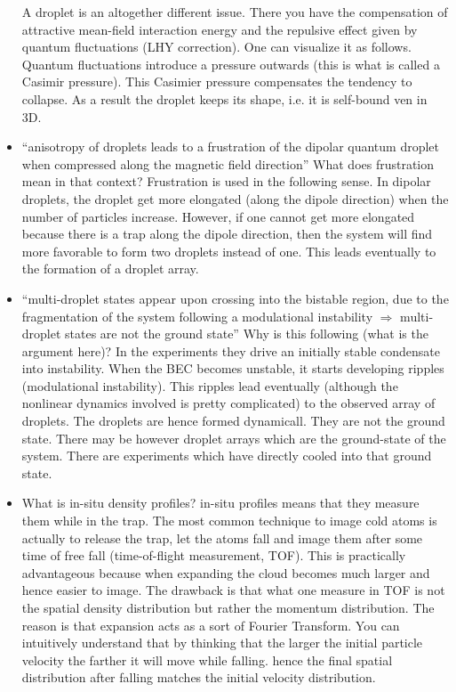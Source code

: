 \begin{itemize}
{A droplet is an altogether different issue. There you have the compensation of attractive mean-field interaction energy and the repulsive effect given by quantum fluctuations (LHY correction). One can visualize it as follows. Quantum fluctuations introduce a pressure outwards (this is what is called a Casimir pressure). This Casimier pressure compensates the tendency to collapse. As a result the droplet keeps its shape, i.e. it is self-bound ven in 3D.                        
}
        \item ``anisotropy of droplets leads to a frustration of the dipolar quantum droplet when
compressed along the magnetic field direction'' What does frustration mean in that context?
                {\color{red}            
Frustration is used in the following sense. In dipolar droplets, the droplet get more elongated (along the dipole direction) when the number of particles increase. However, if one cannot get more elongated because there is a trap along the dipole direction, then the system will find more favorable to form two droplets instead of one. This leads eventually to the formation of a droplet array.
}
        \item ``multi-droplet states appear upon crossing into the bistable region, due to the fragmentation of the system following a modulational instability $\Rightarrow$ multi-droplet states are not the ground state'' Why is this following (what is the argument here)?
                        {\color{red}
                        In the experiments they drive an initially stable condensate into instability. When the BEC becomes unstable, it starts developing ripples (modulational instability). This ripples 
                        lead eventually (although the nonlinear dynamics involved is pretty complicated) to the observed array of droplets. The droplets are hence formed dynamicall. They are not the ground state. There may be however droplet arrays which are the ground-state of the system. There are experiments which have directly cooled into that ground state.
}
        \item What is in-situ density profiles?
                        {\color{red}
in-situ profiles means that they measure them while in the trap. The most common technique to image cold atoms is actually to release the trap, let the atoms fall and image them after some time of free fall (time-of-flight measurement, TOF). This is practically advantageous because when expanding the cloud becomes much larger and hence easier to image. The drawback is that what one measure in TOF is not the spatial density distribution but rather the momentum distribution. The reason is that expansion acts as a sort of Fourier Transform. You can intuitively understand that by thinking that the larger the initial particle velocity the farther it will move while falling. hence the final spatial distribution after falling matches the initial velocity distribution.
}
\end{itemize}
